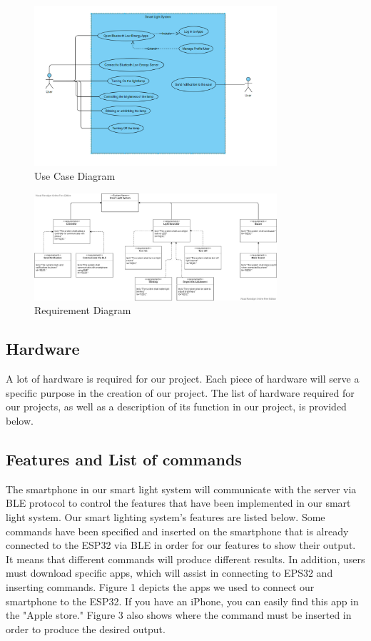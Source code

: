 \begin{figure}[htp]
    \centering
    \includegraphics[width=9cm]{Use.Case.SmartLight}
    \caption{Use Case Diagram}
    \label{bulat1}
\end{figure}

\begin{figure}[htp]
    \centering
    \includegraphics[width=9cm]{Requirement Smart Light}
    \caption{Requirement Diagram}
    \label{bulat2}
\end{figure}


\subsection{Hardware}

A lot of hardware is required for our project. Each piece of hardware will serve a specific purpose in the creation of our project. The list of hardware required for our projects, as well as a description of its function in our project, is provided below.


\subsection{Features and List of commands}
The smartphone in our smart light system will communicate with the server via BLE protocol to control the features that have been implemented in our smart light system. Our smart lighting system's features are listed below. Some commands have been specified and inserted on the smartphone that is already connected to the ESP32 via BLE in order for our features to show their output. It means that different commands will produce different results. In addition, users must download specific apps, which will assist in connecting to EPS32 and inserting commands. Figure 1 depicts the apps we used to connect our smartphone to the ESP32. If you have an iPhone, you can easily find this app in the "Apple store." Figure 3 also shows where the command must be inserted in order to produce the desired output.

